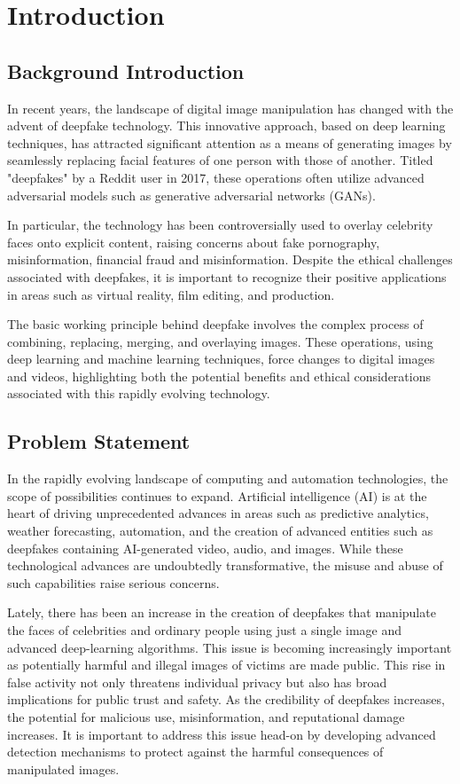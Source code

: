 \chapter{Introduction}
    \section{Background Introduction}
        In recent years, the landscape of digital image manipulation has changed with the advent of deepfake technology.
        This innovative approach, based on deep learning techniques, has attracted significant attention as a means of generating images by seamlessly replacing facial features of one person with those of another.
        Titled "deepfakes" by a Reddit user in 2017, these operations often utilize advanced adversarial models such as generative adversarial networks (GANs).

        In particular, the technology has been controversially used to overlay celebrity faces onto explicit content, raising concerns about fake pornography, misinformation, financial fraud and misinformation.
        Despite the ethical challenges associated with deepfakes, it is important to recognize their positive applications in areas such as virtual reality, film editing, and production.

        The basic working principle behind deepfake involves the complex process of combining, replacing, merging,  and overlaying images.
        These operations, using deep learning and machine learning techniques, force changes to digital images and videos, highlighting both the potential benefits and ethical considerations associated with this rapidly evolving technology.


    \section{Problem Statement}
        In the rapidly evolving landscape of computing and automation technologies, the scope of possibilities continues to expand.
        Artificial intelligence (AI) is at the heart of driving unprecedented advances in areas such as predictive analytics, weather forecasting, automation, and the creation of advanced entities such as deepfakes containing AI-generated video, audio, and images.
        While these technological advances are undoubtedly transformative, the misuse and abuse of such capabilities raise serious concerns.

        Lately, there has been an increase in the creation of deepfakes that manipulate the faces of celebrities and ordinary people using just a single image and advanced deep-learning algorithms.
        This issue is becoming increasingly important as potentially harmful and illegal images of victims are made public.
        This rise in false activity not only threatens individual privacy but also has broad implications for public trust and safety.
        As the credibility of deepfakes increases, the potential for malicious use, misinformation, and reputational damage increases.
        It is important to address this issue head-on by developing advanced detection mechanisms to protect against the harmful consequences of manipulated images.
        
